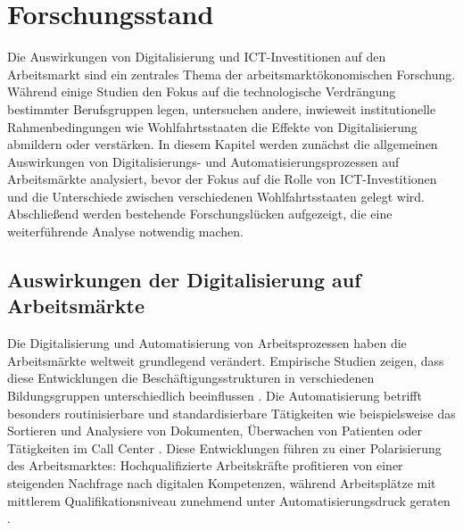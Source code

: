 
\section{Forschungsstand}

Die Auswirkungen von Digitalisierung und \ac{ICT}-Investitionen auf den Arbeitsmarkt sind ein 
zentrales Thema der arbeitsmarktökonomischen Forschung. Während einige Studien den Fokus auf die 
technologische Verdrängung bestimmter Berufsgruppen legen, untersuchen andere, inwieweit 
institutionelle Rahmenbedingungen wie Wohlfahrtsstaaten die Effekte von Digitalisierung abmildern 
oder verstärken. In diesem Kapitel werden zunächst die allgemeinen Auswirkungen von 
Digitalisierungs- und Automatisierungsprozessen auf Arbeitsmärkte analysiert, bevor der Fokus auf 
die Rolle von \ac{ICT}-Investitionen und die Unterschiede zwischen verschiedenen 
Wohlfahrtsstaaten gelegt wird. Abschließend werden bestehende Forschungslücken aufgezeigt, die 
eine weiterführende Analyse notwendig machen.


\subsection{Auswirkungen der Digitalisierung auf Arbeitsmärkte}

Die Digitalisierung und Automatisierung von Arbeitsprozessen haben die Arbeitsmärkte weltweit 
grundlegend verändert. Empirische Studien zeigen, dass diese Entwicklungen die 
Beschäftigungsstrukturen in verschiedenen Bildungsgruppen unterschiedlich beeinflussen 
\parencite[vgl.][S. 1588-1590]{autor2013thegrowth}. Die Automatisierung betrifft besonders 
routinisierbare und standardisierbare Tätigkeiten wie beispielsweise das Sortieren und Analysiere 
von Dokumenten, Überwachen von Patienten oder Tätigkeiten im Call Center 
\parencite[vgl.][S. 19-20]{frey2013thefuture}. Diese Entwicklungen führen zu einer Polarisierung 
des Arbeitsmarktes: Hochqualifizierte Arbeitskräfte profitieren von einer steigenden Nachfrage 
nach digitalen Kompetenzen, während Arbeitsplätze mit mittlerem Qualifikationsniveau zunehmend 
unter Automatisierungsdruck geraten \parencite[vgl.][S. 2509–2510]{goos2014explaining}. 

